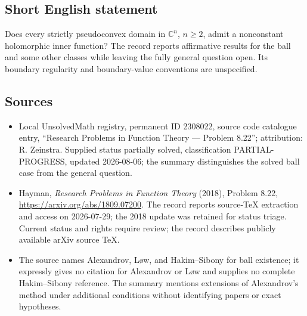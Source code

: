 \documentclass[11pt]{article}
\newcommand{\C}{\mathbb{C}}
\begin{document}
\subsection{Short English statement}
Does every strictly pseudoconvex domain in $\C^n$, $n\geq2$, admit a nonconstant holomorphic inner function? The record reports affirmative results for the ball and some other classes while leaving the fully general question open. Its boundary regularity and boundary-value conventions are unspecified.
\subsection{Sources}
\begin{itemize}
\item Local UnsolvedMath registry, permanent ID 2308022, source code catalogue entry, ``Research Problems in Function Theory --- Problem 8.22''; attribution: R. Zeinstra. Supplied status partially solved, classification PARTIAL-PROGRESS, updated 2026-08-06; the summary distinguishes the solved ball case from the general question.
\item Hayman, \emph{Research Problems in Function Theory} (2018), Problem 8.22, \url{https://arxiv.org/abs/1809.07200}. The record reports source-TeX extraction and access on 2026-07-29; the 2018 update was retained for status triage. Current status and rights require review; the record describes publicly available arXiv source TeX.
\item The source names Alexandrov, L\o w, and Hakim--Sibony for ball existence; it expressly gives no citation for Alexandrov or L\o w and supplies no complete Hakim--Sibony reference. The summary mentions extensions of Alexandrov's method under additional conditions without identifying papers or exact hypotheses.
\end{itemize}
\end{document}
